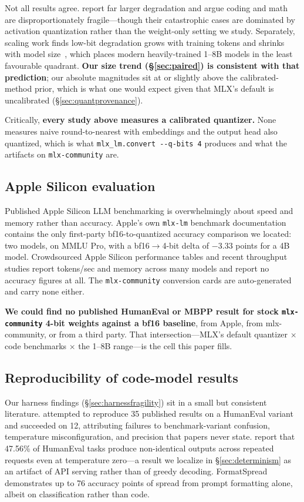 \documentclass[11pt]{article}
\begin{document}
Not all results agree. \citet{shi2025systematic} report far larger degradation and argue
coding and math are disproportionately fragile---though their catastrophic cases are
dominated by activation quantization rather than the weight-only setting we study.
Separately, scaling work finds low-bit degradation grows with training tokens and
shrinks with model size~\citep{ouyang2024lowbit}, which places modern heavily-trained
1--8B models in the least favourable quadrant. \textbf{Our size trend
(\S\ref{sec:paired}) is consistent with that prediction}; our absolute magnitudes sit at
or slightly above the calibrated-method prior, which is what one would expect given that
MLX's default is uncalibrated (\S\ref{sec:quantprovenance}).

Critically, \textbf{every study above measures a calibrated quantizer.} None measures
naive round-to-nearest with embeddings and the output head also quantized, which is what
\texttt{mlx\_lm.convert -{}-q-bits 4} produces and what the artifacts on
\texttt{mlx-community} are.

\subsection{Apple Silicon evaluation}

Published Apple Silicon LLM benchmarking is overwhelmingly about speed and memory rather
than accuracy. Apple's own \texttt{mlx-lm} benchmark
documentation~\citep{applebenchmarks} contains the only first-party bf16-to-quantized
accuracy comparison we located: two models, on MMLU Pro, with a bf16$\to$4-bit delta of
$-3.33$ points for a 4B model. Crowdsourced Apple Silicon performance tables and recent
throughput studies report tokens/sec and memory across many models and report no
accuracy figures at all. The \texttt{mlx-community} conversion cards are auto-generated
and carry none either.

\textbf{We could find no published HumanEval or MBPP result for stock
\texttt{mlx-community} 4-bit weights against a bf16 baseline}, from Apple, from
mlx-community, or from a third party. That intersection---MLX's default quantizer
$\times$ code benchmarks $\times$ the 1--8B range---is the cell this paper fills.

\subsection{Reproducibility of code-model results}

Our harness findings (\S\ref{sec:harnessfragility}) sit in a small but consistent
literature. \citet{szalontai2025repro} attempted to reproduce 35 published results on a
HumanEval variant and succeeded on 12, attributing failures to benchmark-variant
confusion, temperature misconfiguration, and precision that papers never state.
\citet{ouyang2025nondeterminism} report that 47.56\% of HumanEval tasks produce
non-identical outputs across repeated requests even at temperature zero---a result we
localize in \S\ref{sec:determinism} as an artifact of API serving rather than of greedy
decoding. FormatSpread~\citep{sclar2024formatspread} demonstrates up to 76 accuracy
points of spread from prompt formatting alone, albeit on classification rather than
code.
\end{document}
